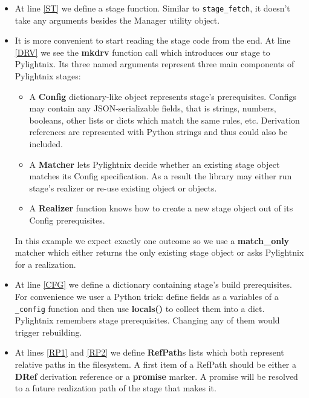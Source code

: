 \begin{itemize}
  \item At line \ref{ST} we define a stage function. Similar to
    \texttt{stage\_fetch}, it doesn't take any arguments besides the
    Manager utility object.
  \item It is more convenient to start reading the stage code from the end.
    At line \ref{DRV} we see the \textbf{mkdrv} function call which
    introduces our stage to Pylightnix. Its three named arguments represent
    three main components of Pylightnix stages:
    \begin{itemize}
      \item A \textbf{Config} dictionary-like object represents stage's
        prerequisites. Configs may contain any JSON-serializable fields,
        that is strings, numbers, booleans, other lists or dicts which
        match the same rules, etc. Derivation references are represented
        with Python strings and thus could also be included.
      \item A \textbf{Matcher} lets Pylightnix decide whether an
        existing stage object matches its Config specification. As a result
        the library may either run stage's realizer or re-use existing
        object or objects.
      \item A \textbf{Realizer} function knows how to create a new
        stage object out of its Config prerequisites.
    \end{itemize}
    In this example we expect exactly one outcome so we use a
    \textbf{match\_only} matcher which either returns the only existing
    stage object or asks Pylightnix for a realization.

  \item At line \ref{CFG} we define a dictionary containing stage's build
    prerequisites. For convenience we user a Python trick: define fields as
    a variables of a \texttt{\_config} function and then use
    \textbf{locals()} to collect them into a dict. Pylightnix remembers
    stage prerequisites. Changing any of them would trigger rebuilding.

  \item At lines \ref{RP1} and \ref{RP2} we define \textbf{RefPath}s lists
    which both represent relative paths in the filesystem. A first item of
    a RefPath should be either a \textbf{DRef} derivation reference or
    a \textbf{promise} marker. A promise will be resolved to a future
    realization path of the stage that makes it.


\end{itemize}
